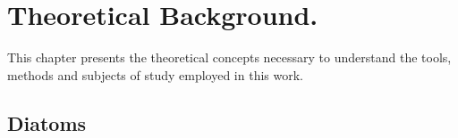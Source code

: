 \documentclass[letterpaper,12pt,oneside]{book}
\begin{document}
\chapter{Theoretical Background.}
This chapter presents the theoretical concepts necessary to understand the tools, methods and subjects of study employed in this work.
\section{Diatoms}
\end{document}
